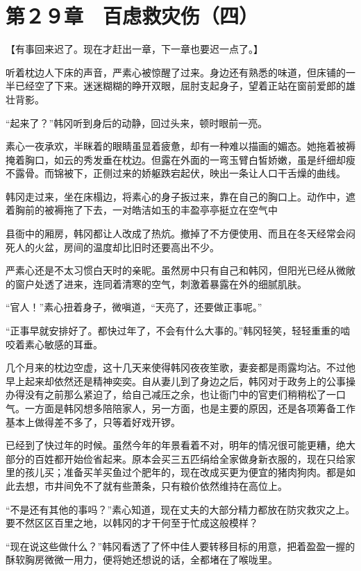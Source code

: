 \section{第２９章　百虑救灾伤（四）}

【有事回来迟了。现在才赶出一章，下一章也要迟一点了。】

听着枕边人下床的声音，严素心被惊醒了过来。身边还有熟悉的味道，但床铺的一半已经空了下来。迷迷糊糊的睁开双眼，屈肘支起身子，望着正站在窗前爱郎的雄壮背影。

“起来了？”韩冈听到身后的动静，回过头来，顿时眼前一亮。

素心一夜承欢，半眯着的眼睛虽显着疲惫，却有一种难以描画的媚态。她拖着被褥掩着胸口，如云的秀发垂在枕边。但露在外面的一弯玉臂白皙娇嫩，虽是纤细却瘦不露骨。而锦被下，正侧过来的娇躯跌宕起伏，映出一条让人口干舌燥的曲线。

韩冈走过来，坐在床榻边，将素心的身子扳过来，靠在自己的胸口上。动作中，遮着胸前的被褥拖了下去，一对皓洁如玉的丰盈亭亭挺立在空气中

县衙中的厢房，韩冈都让人改成了热炕。撤掉了不方便使用、而且在冬天经常会闷死人的火盆，房间的温度却比旧时还要高出不少。

严素心还是不太习惯白天时的亲昵。虽然房中只有自己和韩冈，但阳光已经从微敞的窗户处透了进来，连同着清寒的空气，刺激着暴露在外的细腻肌肤。

“官人！”素心扭着身子，微嗔道，“天亮了，还要做正事呢。”

“正事早就安排好了。都快过年了，不会有什么大事的。”韩冈轻笑，轻轻重重的啮咬着素心敏感的耳垂。

几个月来的枕边空虚，这十几天来使得韩冈夜夜笙歌，妻妾都是雨露均沾。不过他早上起来却依然还是精神奕奕。自从妻儿到了身边之后，韩冈对于政务上的公事操办得没有之前那么紧迫了，给自己减压之余，也让衙门中的官吏们稍稍松了一口气。一方面是韩冈想多陪陪家人，另一方面，也是主要的原因，还是各项筹备工作基本上做得差不多了，只等着好戏开锣。

已经到了快过年的时候。虽然今年的年景看着不对，明年的情况很可能更糟，绝大部分的百姓都开始俭省起来。原本会买三五匹绢给全家做身新衣服的，现在只给家里的孩儿买；准备买羊买鱼过个肥年的，现在改成买更为便宜的猪肉狗肉。都是如此去想，市井间免不了就有些萧条，只有粮价依然维持在高位上。

“不是还有其他的事吗？”素心知道，现在丈夫的大部分精力都放在防灾救灾之上。要不然区区百里之地，以韩冈的才干何至于忙成这般模样？

“现在说这些做什么？”韩冈看透了了怀中佳人要转移目标的用意，把着盈盈一握的酥软胸房微微一用力，便将她还想说的话，全都堵在了喉咙里。

